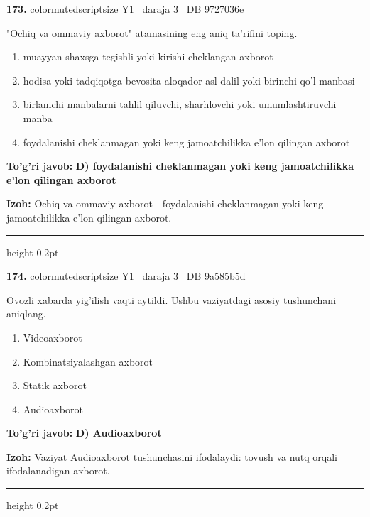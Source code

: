 \documentclass[10pt,a4paper,oneside]{article}
\begin{document}
\noindent\textbf{\color{ink}173.}  {color{muted}scriptsize Y1 \textbullet\ daraja 3 \textbullet\ DB 9727036e}
\par
"Ochiq va ommaviy axborot" atamasining eng aniq ta'rifini toping.
\begin{enumerate}[label=\Alph*),leftmargin=9mm]
\item muayyan shaxsga tegishli yoki kirishi cheklangan axborot
\item hodisa yoki tadqiqotga bevosita aloqador asl dalil yoki birinchi qo'l manbasi
\item birlamchi manbalarni tahlil qiluvchi, sharhlovchi yoki umumlashtiruvchi manba
\item foydalanishi cheklanmagan yoki keng jamoatchilikka e'lon qilingan axborot
\end{enumerate}
\begin{tcolorbox}[enhanced,breakable,colback=teal!4,colframe=teal!50!black,boxrule=0.5pt,arc=1.1mm,left=3mm,right=3mm,top=1.7mm,bottom=1.7mm,before skip=2mm,after skip=2mm]
\textbf{\color{teal}To'g'ri javob:} \textbf{D) foydalanishi cheklanmagan yoki keng jamoatchilikka e'lon qilingan axborot}
\par\smallskip
\textbf{Izoh:} Ochiq va ommaviy axborot - foydalanishi cheklanmagan yoki keng jamoatchilikka e'lon qilingan axborot.
\end{tcolorbox}
\vspace{2mm}\hrule height 0.2pt \vspace{3mm}

\noindent\textbf{\color{ink}174.}  {color{muted}scriptsize Y1 \textbullet\ daraja 3 \textbullet\ DB 9a585b5d}
\par
Ovozli xabarda yig'ilish vaqti aytildi. Ushbu vaziyatdagi asosiy tushunchani aniqlang.
\begin{enumerate}[label=\Alph*),leftmargin=9mm]
\item Videoaxborot
\item Kombinatsiyalashgan axborot
\item Statik axborot
\item Audioaxborot
\end{enumerate}
\begin{tcolorbox}[enhanced,breakable,colback=teal!4,colframe=teal!50!black,boxrule=0.5pt,arc=1.1mm,left=3mm,right=3mm,top=1.7mm,bottom=1.7mm,before skip=2mm,after skip=2mm]
\textbf{\color{teal}To'g'ri javob:} \textbf{D) Audioaxborot}
\par\smallskip
\textbf{Izoh:} Vaziyat Audioaxborot tushunchasini ifodalaydi: tovush va nutq orqali ifodalanadigan axborot.
\end{tcolorbox}
\vspace{2mm}\hrule height 0.2pt \vspace{3mm}
\end{document}
